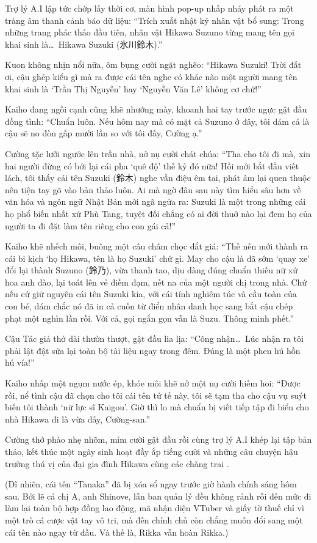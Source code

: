 \documentclass[../main.tex]{subfiles}
\begin{document}
Trợ lý A.I lập tức chớp lấy thời cơ, màn hình pop-up nhấp nháy phát ra một tràng âm thanh cảnh báo dữ liệu: ``Trích xuất nhật ký nhân vật bổ sung: Trong những trang phác thảo đầu tiên, nhân vật Hikawa Suzuno từng mang tên gọi khai sinh là\dots\ Hikawa Suzuki (氷川鈴木).''

Kuon không nhịn nổi nữa, ôm bụng cười ngặt nghẽo: ``Hikawa Suzuki! Trời đất ơi, cậu ghép kiểu gì mà ra được cái tên nghe có khác nào một người mang tên khai sinh là `Trần Thị Nguyễn' hay `Nguyễn Văn Lê' không cơ chứ!''

Kaiho đang ngồi cạnh cũng khẽ nhướng mày, khoanh hai tay trước ngực gật đầu đồng tình: ``Chuẩn luôn. Nếu hôm nay mà có mặt cả Suzuno ở đây, tôi dám cá là cậu sẽ no đòn gấp mười lần so với tôi đấy, Cường ạ.''

Cường tặc lưỡi ngước lên trần nhà, nở nụ cười chát chúa: ``Tha cho tôi đi mà, xin hai người đừng có bới lại cái pha `quê độ' thế kỷ đó nữa! Hồi mới bắt đầu viết lách, tôi thấy cái tên Suzuki (鈴木) nghe vần điệu êm tai, phát âm lại quen thuộc nên tiện tay gõ vào bản thảo luôn. Ai mà ngờ đâu sau này tìm hiểu sâu hơn về văn hóa và ngôn ngữ Nhật Bản mới ngã ngửa ra: Suzuki là một trong những cái họ phổ biến nhất xứ Phù Tang, tuyệt đối chẳng có ai đời thuở nào lại đem họ của người ta đi đặt làm tên riêng cho con gái cả!''

Kaiho khẽ nhếch môi, buông một câu châm chọc đắt giá: ``Thế nên mới thành ra cái bi kịch `họ Hikawa, tên là họ Suzuki' chứ gì. May cho cậu là đã sớm `quay xe' đổi lại thành Suzuno (鈴乃), vừa thanh tao, dịu dàng đúng chuẩn thiếu nữ xứ hoa anh đào, lại toát lên vẻ điềm đạm, nết na của một người chị trong nhà. Chứ nếu cứ giữ nguyên cái tên Suzuki kia, với cái tính nghiêm túc và cầu toàn của con bé, dám chắc nó đã in cả cuốn từ điển nhân danh học sang bắt cậu chép phạt một nghìn lần rồi. Với cả, gọi ngắn gọn vẫn là Suzu. Thông minh phết.''

Cậu Tác giả thở dài thườn thượt, gật đầu lia lịa: ``Công nhận\dots\ Lúc nhận ra tôi phải lật đật sửa lại toàn bộ tài liệu ngay trong đêm. Đúng là một phen hú hồn hú vía!''

Kaiho nhấp một ngụm nước ép, khóe môi khẽ nở một nụ cười hiếm hoi: ``Được rồi, nể tình cậu đã chọn cho tôi cái tên tử tế này, tôi sẽ tạm tha cho cậu vụ suýt biến tôi thành `nữ lực sĩ Kaigou'. Giờ thì lo mà chuẩn bị viết tiếp tập đi biển cho nhà Hikawa đi là vừa đấy, Cường-san.''

Cường thở phào nhẹ nhõm, mỉm cười gật đầu rồi cùng trợ lý A.I khép lại tập bản thảo, kết thúc một ngày sinh hoạt đầy ắp tiếng cười và những câu chuyện hậu trường thú vị của đại gia đình Hikawa cùng các chàng trai \hls.

(Dĩ nhiên, cái tên ``Tanaka'' đã bị xóa sổ ngay trước giờ hành chính sáng hôm sau. Bởi lẽ cả chị A, anh Shinove, lẫn ban quản lý đều không rảnh rỗi đến mức đi làm lại toàn bộ hợp đồng lao động, mã nhận diện VTuber và giấy tờ thuế chỉ vì một trò cá cược vật tay vô tri, mà đến chính chủ còn chẳng muốn đổi sang một cái tên nào ngay từ đầu. Và thế là, Rikka vẫn hoàn Rikka.)
\end{document}
